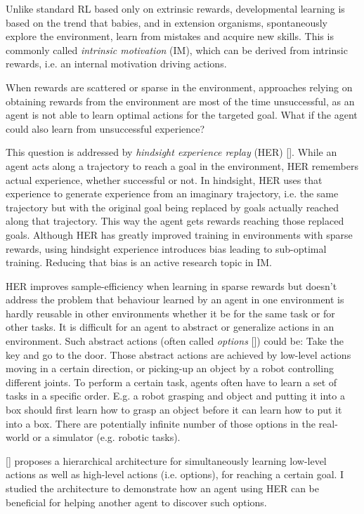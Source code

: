 \documentclass[conference]{IEEEtran}
\begin{document}
Unlike standard RL based only on extrinsic rewards, developmental learning is based on the trend that babies, and in extension organisms, spontaneously explore the environment, learn from mistakes and acquire new skills. This is commonly called \textit{intrinsic motivation} (IM), which can be derived from intrinsic rewards, i.e. an internal motivation driving actions. 

When rewards are scattered or sparse in the environment, approaches relying on obtaining rewards from the environment are most of the time unsuccessful, as an agent is not able to learn optimal actions for the targeted goal. What if the agent could also learn from unsuccessful experience? 

This question is addressed by \textit{hindsight experience replay} (HER) [\cite{andrychowicz2017hindsight}]. While an agent acts along a trajectory to reach a goal in the environment, HER remembers actual experience, whether successful or not. In hindsight, HER uses that experience to generate experience from an imaginary trajectory, i.e. the same trajectory but with the original goal being replaced by goals actually reached along that trajectory. This way the agent gets rewards reaching those replaced goals. Although HER has greatly improved training in environments with sparse rewards, using hindsight experience introduces bias leading to sub-optimal training. Reducing that bias is an active research topic in IM.

HER improves sample-efficiency when learning in sparse rewards but doesn't address the problem that behaviour learned by an agent in one environment is hardly reusable in other environments whether it be for the same task or for other tasks. It is difficult for an agent to abstract or generalize actions in an environment. Such abstract actions (often called \textit{options} [\cite{sutton1999between}]) could be: Take the key and go to the door. Those abstract actions are achieved by low-level actions moving in a certain direction, or picking-up an object by a robot controlling different joints. To perform a certain task, agents often have to learn a set of tasks in a specific order. E.g. a robot grasping and object and putting it into a box should first learn how to grasp an object before it can learn how to put it into a box. There are potentially infinite number of those options in the real-world or a simulator (e.g. robotic tasks).

[\cite{bacon2017option}] proposes a hierarchical architecture for simultaneously learning low-level actions as well as high-level actions (i.e. options), for reaching a certain goal. I studied the architecture to demonstrate how an agent using HER can be beneficial for helping another agent to discover such options.
\end{document}
